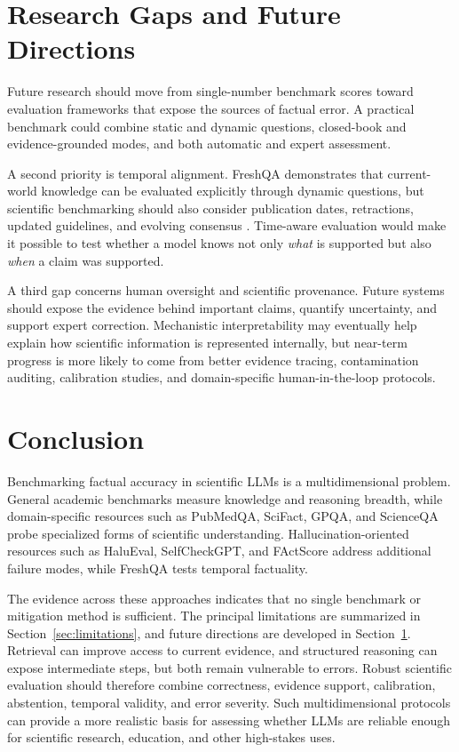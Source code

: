 \documentclass[10pt,a4paper]{article}
\begin{document}
\section{Research Gaps and Future Directions}\label{sec:future}

Future research should move from single-number benchmark scores toward evaluation frameworks that expose the sources of factual error. A practical benchmark could combine static and dynamic questions, closed-book and evidence-grounded modes, and both automatic and expert assessment.

A second priority is temporal alignment. FreshQA demonstrates that current-world knowledge can be evaluated explicitly through dynamic questions, but scientific benchmarking should also consider publication dates, retractions, updated guidelines, and evolving consensus \cite{vu2024freshllms}. Time-aware evaluation would make it possible to test whether a model knows not only \emph{what} is supported but also \emph{when} a claim was supported.

A third gap concerns human oversight and scientific provenance. Future systems should expose the evidence behind important claims, quantify uncertainty, and support expert correction. Mechanistic interpretability may eventually help explain how scientific information is represented internally, but near-term progress is more likely to come from better evidence tracing, contamination auditing, calibration studies, and domain-specific human-in-the-loop protocols.

\section{Conclusion}\label{sec:conclusion}

Benchmarking factual accuracy in scientific LLMs is a multidimensional problem. General academic benchmarks measure knowledge and reasoning breadth, while domain-specific resources such as PubMedQA, SciFact, GPQA, and ScienceQA probe specialized forms of scientific understanding. Hallucination-oriented resources such as HaluEval, SelfCheckGPT, and FActScore address additional failure modes, while FreshQA tests temporal factuality.

The evidence across these approaches indicates that no single benchmark or mitigation method is sufficient. The principal limitations are summarized in Section~\ref{sec:limitations}, and future directions are developed in Section~\ref{sec:future}. Retrieval can improve access to current evidence, and structured reasoning can expose intermediate steps, but both remain vulnerable to errors. Robust scientific evaluation should therefore combine correctness, evidence support, calibration, abstention, temporal validity, and error severity. Such multidimensional protocols can provide a more realistic basis for assessing whether LLMs are reliable enough for scientific research, education, and other high-stakes uses.



\end{document}
